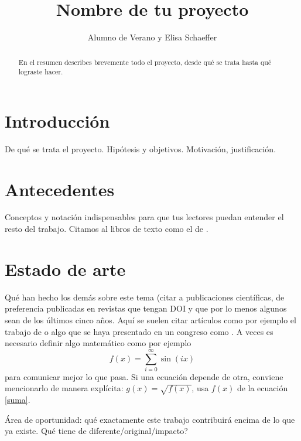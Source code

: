 \documentclass[a1]{sciposter} %
\title{Nombre de tu proyecto}
\author{Alumno de Verano y Elisa Schaeffer}
\institute {Posgrado en Ingeniería de Sistemas}
\begin{document}

\maketitle
\begin{abstract}
En el resumen describes brevemente todo el proyecto, desde qué se
trata hasta qué lograste hacer.
\end{abstract}

\begin{multicols}{2} 

\section{Introducción}

De qué se trata el proyecto. Hipótesis y objetivos. Motivación,
justificación.

\section{Antecedentes}

Conceptos y notación indispensables para que tus lectores puedan
entender el resto del trabajo. Citamos al libros de texto como el de
\citet{ai}.

\section{Estado de arte}

Qué han hecho los demás sobre este tema (citar a publicaciones
científicas, de preferencia publicadas en revistas que tengan DOI y
que por lo menos algunos sean de los últimos cinco años. Aquí se
suelen citar artículos como por ejemplo el trabajo de \citet{elisa} o
algo que se haya presentado en un congreso como \citet{ar}. A veces es
necesario definir algo matemático como por ejemplo
\begin{equation}
    f(x) = \sum_{i = 0}^\infty \sin(i x)
    \label{suma}
\end{equation}
para comunicar mejor lo que pasa. Si una ecuación depende de otra,
conviene mencionarlo de manera explícita: $g(x) = \sqrt{f(x)}$, usa
$f(x)$ de la ecuación \eqref{suma}.

Área de oportunidad: qué exactamente este trabajo contribuirá encima
de lo que ya existe.  {\textquestiondown}Qué tiene de
diferente/original/impacto?


\end{multicols}
\end{document}
